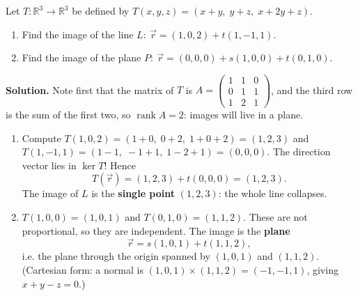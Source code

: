 \documentclass[11pt]{article}
\begin{document}
\begin{exoresolu}
Let $T:\mathbb{R}^3\to\mathbb{R}^3$ be defined by $T(x,y,z)=(x+y,\;y+z,\;x+2y+z)$.
\begin{enumerate}
\item Find the image of the line $L:\ \vec{r}=(1,0,2)+t(1,-1,1)$.
\item Find the image of the plane $P:\ \vec{r}=(0,0,0)+s(1,0,0)+t(0,1,0)$.
\end{enumerate}
\tcblower
\textbf{Solution.} Note first that the matrix of $T$ is $A=\begin{pmatrix}1&1&0\\0&1&1\\1&2&1\end{pmatrix}$, and the third row is the sum of the first two, so $\operatorname{rank} A=2$: images will live in a plane.
\begin{enumerate}
\item Compute $T(1,0,2)=(1+0,\;0+2,\;1+0+2)=(1,2,3)$ and $T(1,-1,1)=(1-1,\;-1+1,\;1-2+1)=(0,0,0)$. The direction vector lies in $\ker T$! Hence
\[
T(\vec{r})=(1,2,3)+t(0,0,0)=(1,2,3).
\]
The image of $L$ is the \textbf{single point} $(1,2,3)$: the whole line collapses.

\item $T(1,0,0)=(1,0,1)$ and $T(0,1,0)=(1,1,2)$. These are not proportional, so they are independent. The image is the \textbf{plane}
\[
\vec{r}=s(1,0,1)+t(1,1,2),
\]
i.e. the plane through the origin spanned by $(1,0,1)$ and $(1,1,2)$. (Cartesian form: a normal is $(1,0,1)\times(1,1,2)=(-1,-1,1)$, giving $x+y-z=0$.)
\end{enumerate}
\end{exoresolu}
\end{document}
